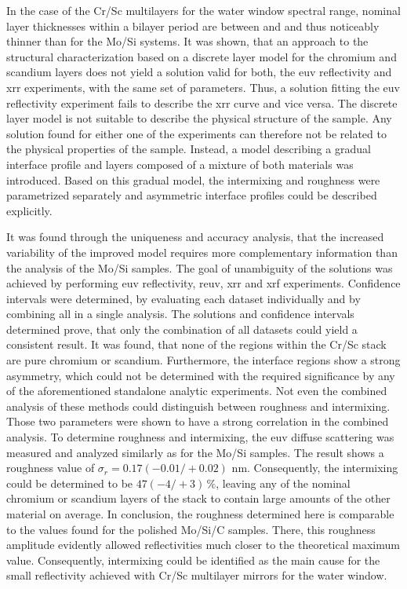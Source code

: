 In the case of the Cr/Sc multilayers for the water window spectral range, nominal layer thicknesses within a bilayer period are between  and  and thus noticeably thinner than for the Mo/Si systems. It was shown, that an approach to the structural characterization based on a discrete layer model for the chromium and scandium layers does not yield a solution valid for both, the \gls{euv} reflectivity and \gls{xrr} experiments, with the same set of parameters. Thus, a solution fitting the \gls{euv} reflectivity experiment fails to describe the \gls{xrr} curve and vice versa. The discrete layer model is not suitable to describe the physical structure of the sample. Any solution found for either one of the experiments can therefore not be related to the physical properties of the sample. Instead, a model describing a gradual interface profile and layers composed of a mixture of both materials was introduced. Based on this gradual model, the intermixing and roughness were parametrized separately and asymmetric interface profiles could be described explicitly.

It was found through the uniqueness and accuracy analysis, that the increased variability of the improved model requires more complementary information than the analysis of the Mo/Si samples. The goal of unambiguity of the solutions was achieved by performing \gls{euv} reflectivity, \gls{reuv}, \gls{xrr} and \gls{xrf} experiments. Confidence intervals were determined, by evaluating each dataset individually and by combining all in a single analysis. The solutions and confidence intervals determined prove, that only the combination of all datasets could yield a consistent result. It was found, that none of the regions within the Cr/Sc stack are pure chromium or scandium. Furthermore, the interface regions show a strong asymmetry, which could not be determined with the required significance by any of the aforementioned standalone analytic experiments. Not even the combined analysis of these methods could distinguish between roughness and intermixing. Those two parameters were shown to have a strong correlation in the combined analysis. To determine roughness and intermixing, the \gls{euv} diffuse scattering was measured and analyzed similarly as for the Mo/Si samples. The result shows a roughness value of $\sigma_r = 0.17  (-0.01/+0.02)$ nm. Consequently, the intermixing could be determined to be $47 (-4/+3)\, \%$, leaving any of the nominal chromium or scandium layers of the stack to contain large amounts of the other material on average. In conclusion, the roughness determined here is comparable to the values found for the polished Mo/Si/C samples. There, this roughness amplitude evidently allowed reflectivities much closer to the theoretical maximum value. Consequently, intermixing could be identified  as the main cause for the small reflectivity achieved with Cr/Sc multilayer mirrors for the water window.

